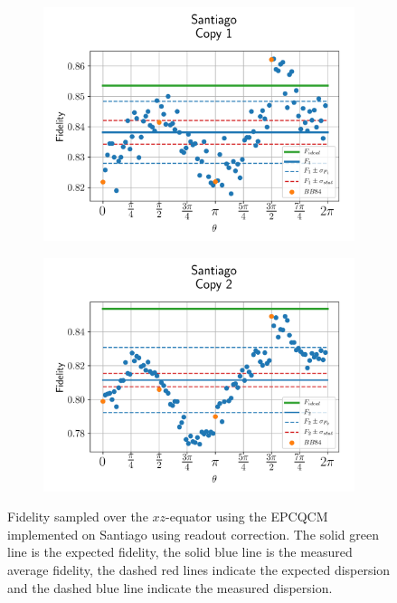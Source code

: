 \begin{figure}[H]
  \centering
  \begin{subfigure}{.5\textwidth}
    \centering
    \includegraphics[width=\textwidth]{Figures/Economical/IBM/OnlyEquator/results_corrected_santiago_copy1.png}
    \label{fig:epc_corrected_santiago_equator_1}
  \end{subfigure}%
  \begin{subfigure}{.5\textwidth}
    \centering
    \includegraphics[width=\textwidth]{Figures/Economical/IBM/OnlyEquator/results_corrected_santiago_copy2.png}
    \label{fig:epc_corrected_santiago_equator_2}
  \end{subfigure}
  \vspace{-0.5cm}
  \caption{Fidelity sampled over the $xz$-equator using the EPCQCM implemented on Santiago using readout correction. The solid green line is the expected fidelity, the solid blue line is the measured average fidelity, the dashed red lines indicate the expected dispersion and the dashed blue line indicate the measured dispersion.}
  \label{fig:epc_corrected_santiago_equator}
\end{figure}

